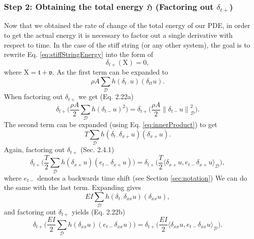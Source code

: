 \documentclass{article}
\begin{document}
\subsubsection*{Step 2: Obtaining the total energy $\mathfrak{H}$ (Factoring out $\delta_{t+}$)}
Now that we obtained the rate of change of the total energy of our PDE, in order to get the actual energy it is necessary to factor out a single derivative with respect to time.
 In the case of the stiff string (or any other system), the goal is to rewrite Eq. \eqref{eq:stiffStringEnergy} into the form of
\begin{equation}\label{eq:forwardTimeForm}
    \delta_{t+}(\text{X}) = 0,
\end{equation}
where $\text{X}=\mathfrak{t} + \mathfrak{v}$.
As the first term can be expanded to
\begin{equation}
    \rho A\sum_\mathcal{D}h(\delta_{t\cdot}u)(\delta_{tt}u).
\end{equation}
When factoring out $\delta_{t+}$ we get (Eq. 2.22a)
\begin{equation}
\delta_{t+}\Bigg(\frac{\rho A}{2}\sum_\mathcal{D}h(\delta_{t-}u)^2\Bigg) = \delta_{t+}\Bigg(\frac{\rho A}{2} \left\lVert\delta_{t-}u\right\rVert_\mathcal{D}^2\Bigg).
\end{equation}
The second term can be expanded (using Eq. \eqref{eq:innerProduct}) to get
\begin{equation}
    T \sum_{\mathcal{D}}h (\delta_{t\cdot}\delta_{x+}u)(\delta_{x+}u).
\end{equation}
Again, factoring out $\delta_{t+}$ (Sec. 2.4.1)
\begin{equation}
    \delta_{t+}\Bigg(\frac{T}{2}\sum_\mathcal{D}h (\delta_{x+}u)( e_{t-}\delta_{x+}u)\Bigg) = \delta_{t+}\Bigg(\frac{T}{2}\langle\delta_{x+}u, e_{t-}\delta_{x+}u\rangle_\mathcal{D}\Bigg),
\end{equation}
where $e_{t-}$ denotes a backwards time shift (see Section \ref{sec:notation})
We can do the same with the last term. Expanding gives
\begin{equation}
    EI \sum_{\mathcal{D}}h(\delta_{t\cdot}\delta_{xx}u)(\delta_{xx}u),
\end{equation}
and factoring out $\delta_{t+}$ yields (Eq. 2.22b)
\begin{equation}
    \delta_{t+}\Bigg(\frac{EI}{2}\sum_\mathcal{D}h(\delta_{xx}u)(e_{t-}\delta_{xx}u)\Bigg) = \delta_{t+}\Bigg(\frac{EI}{2}\langle\delta_{xx}u,e_{t-}\delta_{xx}u\rangle_\mathcal{D}\Bigg).
\end{equation}
\end{document}
